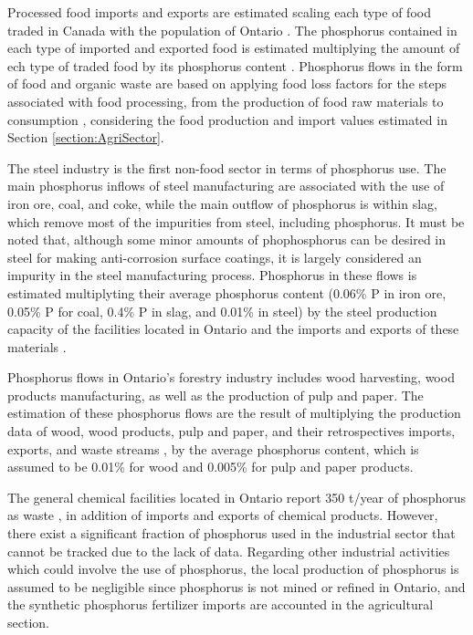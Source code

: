 \documentclass[authoryear]{elsarticle}
\begin{document}
Processed food imports and exports
are estimated scaling each type of food 
traded in Canada \citep{TradeDataOnlineCanada}
with the population of Ontario \citep{PopulationCanada}.
The phosphorus contained in each type of imported and exported food is estimated multiplying the amount of ech type of traded food by its phosphorus content \citep{CanadianNutrientFile}. Phosphorus flows in the form of food and organic waste are based on applying food loss factors for the steps associated with food processing, from the production of food raw materials to consumption \citep{FoodLossesFAO}, considering the food production and import values estimated in Section \ref{section:AgriSector}.

The steel industry is the first non-food sector in terms of phosphorus use. The main phosphorus inflows of steel manufacturing are associated with the use of iron ore, coal, and coke, while the main outflow of phosphorus is within slag, which remove most of the impurities from steel, including phosphorus. It must be noted that, although some minor amounts of phophosphorus can be desired in steel for making anti-corrosion surface coatings, it is largely considered an impurity in the steel manufacturing process. Phosphorus in these flows is estimated multiplyting their average phosphorus content (0.06\% P in iron ore, 0.05\% P for coal, 0.4\% P in slag, and 0.01\% in steel) \citep{yokoyama2007separation} by the steel production capacity of the facilities located in Ontario \citep{CheminfoServices, AlgomaSteel, Stelco, PFlows_Ontario} and the imports and exports of these materials \citep{WorldIntegratedTradeSolution, InterprovincialImportsExports}.

Phosphorus flows in Ontario's forestry industry includes wood harvesting, wood products manufacturing, as well as the production of pulp and paper. The estimation of these phosphorus flows are the result of multiplying the production data of wood, wood products, pulp and paper, and their retrospectives imports, exports, and waste streams \citep{CanadianForestServiceStatistics, InterprovincialImportsExports}, by the average phosphorus content, which is assumed to be 0.01\% for wood \citep{sardans2013tree} and 0.005\% for pulp and paper products.

The general chemical facilities located in Ontario report 350 t/year of phosphorus as waste \citep{PFlows_Ontario}, in addition of imports and exports of chemical products. However, there exist a significant fraction of phosphorus used in the industrial sector that cannot be tracked due to the lack of data. Regarding other industrial activities which could involve the use of phosphorus, the local production of phosphorus is assumed to be negligible since phosphorus is not mined or refined in Ontario, and the synthetic phosphorus fertilizer imports are accounted in the agricultural section.
\end{document}
